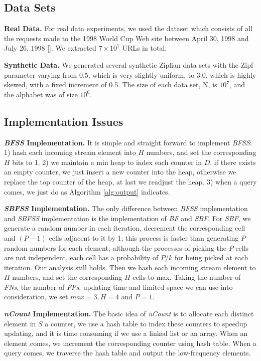 \documentclass[conference]{IEEEtran}
\begin{document}
\subsection{Data Sets}
\textbf{Real Data.} For real data experiments, we used the dataset which consists of all the requests made to the 1998 World Cup Web site between April 30, 1998 and July 26, 1998 []. We extracted $7\times10^7$ URLs in total.\par
\textbf{Synthetic Data.} We generated several synthetic Zipﬁan data sets with the Zipf parameter varying from 0.5, which is very slightly uniform, to 3.0, which is highly skewed, with a fixed increment of 0.5. The size of each data set, N, is $10^7$, and the alphabet was of size $10^6$.
\subsection{Implementation Issues}
\textbf{\emph{BFSS} Implementation.} It is simple and straight forward to implement \emph{BFSS}: 1) hash each incoming stream element into $H$ numbers, and set the corresponding $H$ bits to 1. 2) we maintain a min heap to index each counter in $D$, if there exists an empty counter, we just insert a new counter into the heap, otherwise we replace the top counter of the heap, at last we readjust the heap. 3) when a query comes, we just do as Algorithm \ref{alg:output} indicates.\par

\textbf{\emph{SBFSS} Implementation.} The only difference between \emph{BFSS} implementation and \emph{SBFSS} implementation is the implementation of \emph{BF} and \emph{SBF}. For \emph{SBF}, we generate a random number in each iteration, decrement the corresponding cell and $(P-1)$ cells adjacent to it by 1; this process is faster than generating $P$ random numbers for each element; although the processes of picking the $P$ cells are not independent, each cell has a probability of $P/k$ for being picked at each iteration. Our analysis still holds. Then we hash each incoming stream element to $H$ numbers, and set the corresponding $H$ cells to max. Taking the number of \emph{FNs}, the number of \emph{FPs}, updating time and limited space we can use into consideration, we set $max=3, H=4$ and $P=1$.\par

\textbf{\emph{nCount} Implementation.} The basic idea of \emph{nCount} is to allocate each distinct element in $S$ a counter, we use a hash table to index these counters to speedup updating, and it is time consuming if we use a linked list or an array. When an element comes, we increment the corresponding counter using hash table. When a query comes, we traverse the hash table and output the low-frequency elements. \par
\end{document}
